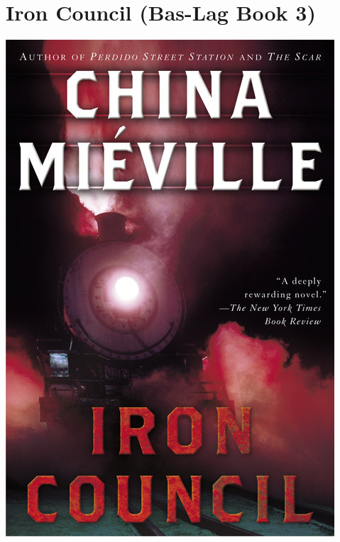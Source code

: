 \documentclass{tufte-handout}
\makeatletter
\newcommand{\varcaption}[2][0pt]{%
  \gsetlength{\@tufte@caption@vertical@offset}{-#1}%
  \gdef\@tufte@stored@varcaption{#2}%
}
\gdef\@tufte@stored@varcaption{} %
\makeatother
\begin{document}
\section*{Iron Council (Bas-Lag Book 3)}
\begin{marginfigure}[12\baselineskip]
   \includegraphics[width=\linewidth]{images/iron_council.jpg}
   \varcaption{\href{https://www.penguinrandomhouse.com/books/114259/iron-council-by-china-mieville/9780345458421/}{Publisher Link}, \href{https://www.amazon.com/Iron-Council-Bas-Lag-China-Miéville/dp/0345458427/}{Amazon Link}}
\end{marginfigure}
\end{document}

